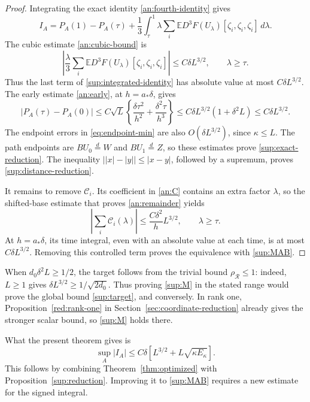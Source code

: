 \documentclass[11pt,a4paper]{article}
\theoremstyle{remark}
\newcommand{\E}{\mathbb E}
\newcommand{\rh}{\rho_{\mathcal R}}
\newcommand{\dd}{\,d}
\begin{document}
\begin{proof}
Integrating the exact identity \eqref{an:fourth-identity} gives
\begin{equation}
 I_A=P_A(1)-P_A(\tau)
       +\frac13\int_\tau^1\lambda
          \sum_i\E D^3F(U_\lambda)[\zeta_i,\zeta_i,\zeta_i]
          \dd\lambda.
 \label{sup:integrated-identity}
\end{equation}
The cubic estimate \eqref{an:cubic-bound} is
\[
 \left|\frac\lambda3
       \sum_i\E D^3F(U_\lambda)[\zeta_i,\zeta_i,\zeta_i]\right|
 \le C\delta L^{3/2},\qquad \lambda\ge\tau.
\]
Thus the last term of \eqref{sup:integrated-identity} has absolute
value at most \(C\delta L^{3/2}\). The early estimate
\eqref{an:early}, at \(h=a_*\delta\), gives
\[
 |P_A(\tau)-P_A(0)|
 \le C\sqrt L\left\{\frac{\delta\tau^2}{h^2}
                        +\frac{\delta^2\tau}{h^3}\right\}
 \le C\delta L^{3/2}(1+\delta^2L)
 \le C\delta L^{3/2}.
\]
The endpoint errors in \eqref{eq:endpoint-min} are also
\(O(\delta L^{3/2})\), since \(\kappa\le L\).
The path endpoints are \(BU_0\overset d=W\) and
\(BU_1\overset d=Z\), so these estimates prove
\eqref{sup:exact-reduction}. The inequality
\(\big||x|-|y|\big|\le|x-y|\), followed by a supremum, proves
\eqref{sup:distance-reduction}.

It remains to remove \(\mathcal C_i\). Its coefficient in
\eqref{an:C} contains an extra factor \(\lambda\), so the shifted-base estimate
that proves \eqref{an:remainder} yields
\begin{equation}
 \left|\sum_i\mathcal C_i(\lambda)\right|
 \le\frac{C\delta^2}{h}L^{3/2},\qquad \lambda\ge\tau.
 \label{sup:C-bound}
\end{equation}
At \(h=a_*\delta\), its time integral, even with an absolute value
at each time, is at most \(C\delta L^{3/2}\). Removing this controlled
term proves the equivalence with \eqref{sup:MAB}.
\end{proof}

When \(d_0\delta^2L\ge1/2\), the target follows from the trivial
bound \(\rh\le1\): indeed, \(L\ge1\) gives
\(\delta L^{3/2}\ge1/\sqrt{2d_0}\).
Thus proving \eqref{sup:M} in the stated range would prove the global
bound \eqref{sup:target}, and conversely. In rank one,
Proposition~\ref{red:rank-one} in
Section~\ref{sec:coordinate-reduction} already gives the stronger scalar
bound, so \eqref{sup:M} holds there.

What the present theorem gives is
\[
 \sup_A|I_A|
 \le C\delta\left[L^{3/2}+L\sqrt{\kappa E_\kappa}\right].
\]
This follows by combining Theorem~\ref{thm:optimized} with
Proposition~\ref{sup:reduction}. Improving it to \eqref{sup:MAB} requires
a new estimate for the signed integral.
\end{document}
